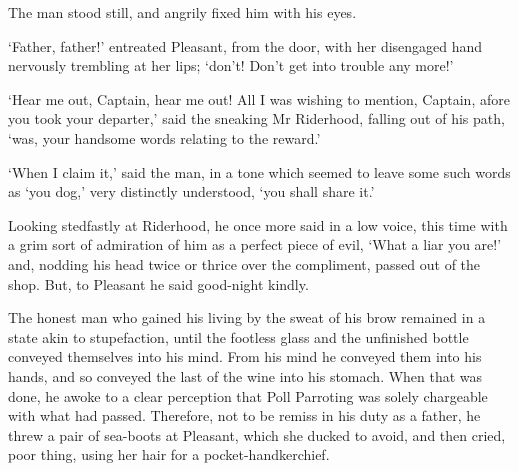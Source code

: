 The man stood still, and angrily fixed him with his eyes.

‘Father, father!’ entreated Pleasant, from the door, with her disengaged
hand nervously trembling at her lips; ‘don’t! Don’t get into trouble any
more!’

‘Hear me out, Captain, hear me out! All I was wishing to mention,
Captain, afore you took your departer,’ said the sneaking Mr Riderhood,
falling out of his path, ‘was, your handsome words relating to the
reward.’

‘When I claim it,’ said the man, in a tone which seemed to leave some
such words as ‘you dog,’ very distinctly understood, ‘you shall share
it.’

Looking stedfastly at Riderhood, he once more said in a low voice, this
time with a grim sort of admiration of him as a perfect piece of evil,
‘What a liar you are!’ and, nodding his head twice or thrice over the
compliment, passed out of the shop. But, to Pleasant he said good-night
kindly.

The honest man who gained his living by the sweat of his brow remained
in a state akin to stupefaction, until the footless glass and the
unfinished bottle conveyed themselves into his mind. From his mind he
conveyed them into his hands, and so conveyed the last of the wine into
his stomach. When that was done, he awoke to a clear perception that
Poll Parroting was solely chargeable with what had passed. Therefore,
not to be remiss in his duty as a father, he threw a pair of sea-boots
at Pleasant, which she ducked to avoid, and then cried, poor thing,
using her hair for a pocket-handkerchief.



